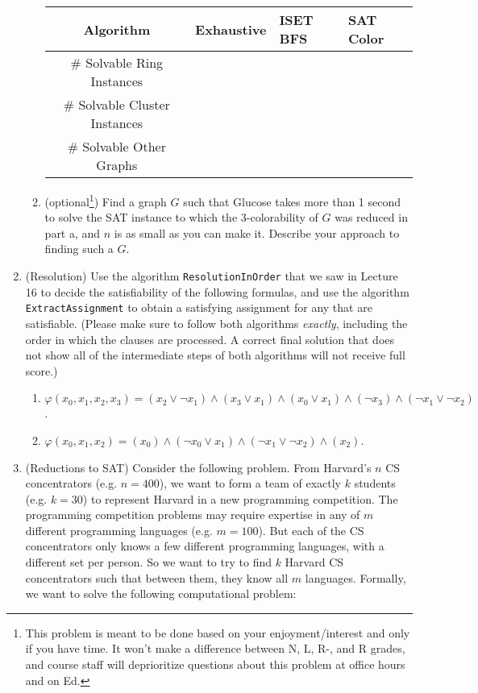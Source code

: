 \documentclass[11pt]{article}
\begin{document}
\begin{enumerate}
\begin{enumerate}
\begin{center}
    \begin{tabular}{|c|l|l|l|}
    \hline 
    Algorithm
    & \multicolumn{1}{|p{2cm}|}{Exhaustive}
    & \multicolumn{1}{|p{2cm}|}{ISET BFS}
    & \multicolumn{1}{|p{2cm}|}{SAT Color}\\\hline
    \hline
        \# Solvable Ring Instances &  &  & \\
        \# Solvable Cluster Instances  &   & &  \\
        \# Solvable Other Graphs  &   & &  \\
        \hline
    \end{tabular}
\end{center}

    \item (optional\footnote{This problem is meant to be done based on your enjoyment/interest and only if you have time. It won't make a difference between N, L, R-, and R grades, and course staff will deprioritize questions about this problem at office hours and on Ed.}) Find a graph $G$ such that Glucose takes more than 1 second to solve the SAT instance to which the 3-colorability of $G$ was reduced in part a, and $n$ is as small as you can make it. Describe your approach to finding such a $G$. 
  \end{enumerate}

\item (Resolution) Use the algorithm \texttt{ResolutionInOrder} that we saw in Lecture 16 to decide the satisfiability of the following formulas, and use the algorithm \texttt{ExtractAssignment} to obtain a satisfying assignment for any that are satisfiable. (Please make sure to follow both algorithms \textit{exactly}, including the order in which the clauses are processed. A correct final solution that does not show all of the intermediate steps of both algorithms will not receive full score.)
  
  \begin{enumerate}
      \item $\varphi(x_0, x_1, x_2, x_3) = (x_2 \vee \neg x_1) \wedge (x_3 \vee x_1) \wedge (x_0 \vee x_1) \wedge (\neg x_3) \wedge (\neg x_1 \vee \neg x_2)$.

      \item $\varphi(x_0, x_1, x_2) = (x_0) \wedge (\neg x_0 \vee x_1) \wedge (\neg x_1 \vee \neg x_2) \wedge (x_2)$.

  \end{enumerate}
  
\item (Reductions to SAT)  Consider the following problem.  From Harvard's $n$ CS concentrators (e.g. $n=400$), we want to form a team of exactly $k$ students (e.g. $k=30$) to represent Harvard in a new programming competition.  The programming competition problems may require expertise in any of $m$ different programming languages (e.g. $m=100$).  But each of the CS concentrators only knows a few different programming languages, with a different set per person. So we want to try to find $k$ Harvard CS concentrators such that between them, they know all $m$ languages. Formally, we want to solve the following computational problem:


\end{enumerate}
\end{document}
